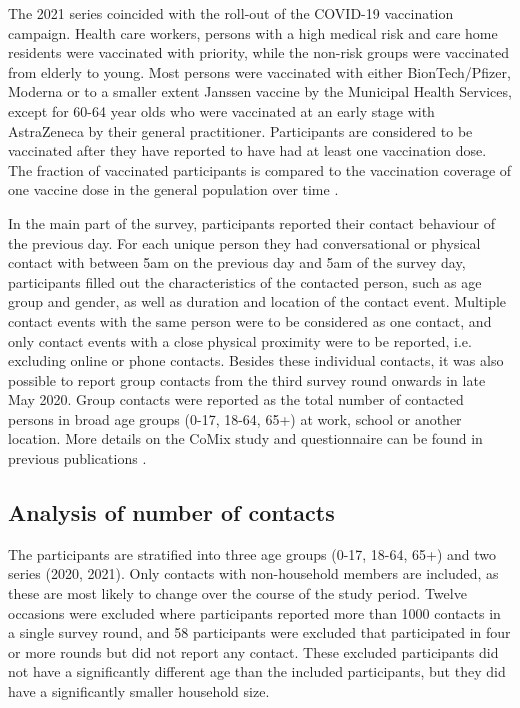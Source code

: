\documentclass[fleqn,10pt]{wlscirep}
\begin{document}
The 2021 series coincided with the roll-out of the COVID-19 vaccination campaign. Health care workers, persons with a high medical risk and care home residents were vaccinated with priority, while the non-risk groups were vaccinated from elderly to young. Most persons were vaccinated with either BionTech/Pfizer, Moderna or to a smaller extent Janssen vaccine by the Municipal Health Services, except for 60-64 year olds who were vaccinated at an early stage with AstraZeneca by their general practitioner. Participants are considered to be vaccinated after they have reported to have had at least one vaccination dose. The fraction of vaccinated participants is compared to the vaccination coverage of one vaccine dose in the general population over time \cite{RIVM_2022}. 

In the main part of the survey, participants reported their contact behaviour of the previous day. For each unique person they had conversational or physical contact with between 5am on the previous day and 5am of the survey day, participants filled out the characteristics of the contacted person, such as age group and gender, as well as duration and location of the contact event. Multiple contact events with the same person were to be considered as one contact, and only contact events with a close physical proximity were to be reported, i.e. excluding online or phone contacts. Besides these individual contacts, it was also possible to report group contacts from the third survey round onwards in late May 2020. Group contacts were reported as the total number of contacted persons in broad age groups (0-17, 18-64, 65+) at work, school or another location. More details on the CoMix study and questionnaire can be found in previous publications \cite{Jarvis_2020, Verelst_2021, Gimma_2022}.


\subsection*{Analysis of number of contacts}

The participants are stratified into three age groups (0-17, 18-64, 65+) and two series (2020, 2021). Only contacts with non-household members are included, as these are most likely to change over the course of the study period. Twelve occasions were excluded where participants reported more than 1000 contacts in a single survey round, and 58 participants were excluded that participated in four or more rounds but did not report any contact. These excluded participants did not have a significantly different age than the included participants, but they did have a significantly smaller household size.
\end{document}
